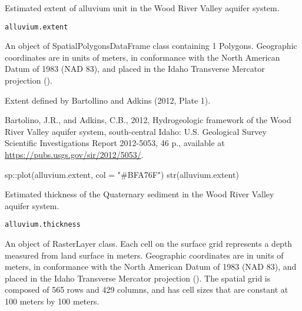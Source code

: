 \documentclass[a4paper]{book}
\begin{document}
%
\begin{Description}\relax
Estimated extent of alluvium unit in the Wood River Valley aquifer system.
\end{Description}
%
\begin{Usage}
\begin{verbatim}
alluvium.extent
\end{verbatim}
\end{Usage}
%
\begin{Format}
An object of SpatialPolygonsDataFrame class containing 1 Polygons.
Geographic coordinates are in units of meters, in conformance with the
North American Datum of 1983 (NAD 83), and placed in the
Idaho Transverse Mercator projection ().
\end{Format}
%
\begin{Source}\relax
Extent defined by Bartollino and Adkins (2012, Plate 1).
\end{Source}
%
\begin{References}\relax
Bartolino, J.R., and Adkins, C.B., 2012,
Hydrogeologic framework of the Wood River Valley aquifer system, south-central Idaho:
U.S. Geological Survey Scientific Investigations Report 2012-5053, 46 p.,
available at \url{https://pubs.usgs.gov/sir/2012/5053/}.
\end{References}
%
\begin{Examples}
\begin{ExampleCode}
sp::plot(alluvium.extent, col = "#BFA76F")
str(alluvium.extent)

\end{ExampleCode}
\end{Examples}
%
\begin{Description}\relax
Estimated thickness of the Quaternary sediment in the Wood River Valley aquifer system.
\end{Description}
%
\begin{Usage}
\begin{verbatim}
alluvium.thickness
\end{verbatim}
\end{Usage}
%
\begin{Format}
An object of RasterLayer class.
Each cell on the surface grid represents a depth measured from land surface in meters.
Geographic coordinates are in units of meters, in conformance with the
North American Datum of 1983 (NAD 83), and placed in the
Idaho Transverse Mercator projection ().
The spatial grid is composed of 565 rows and 429 columns,
and has cell sizes that are constant at 100 meters by 100 meters.
\end{Format}
\end{document}
